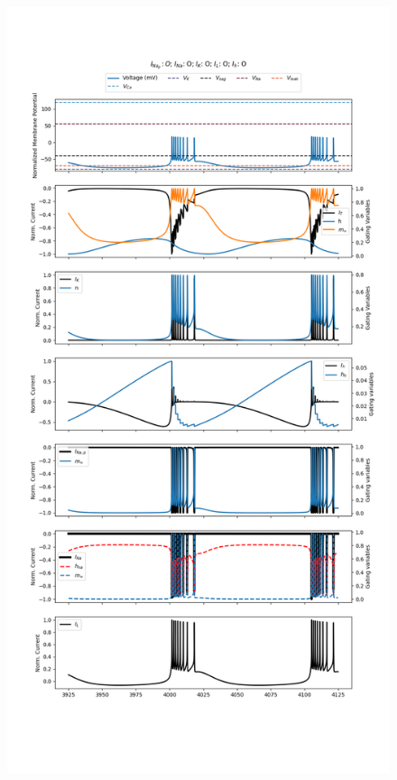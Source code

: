 \documentclass[../../workflow.tex]{subfiles}
\begin{document}
\begin{figure}[H]
    \centering
    \includegraphics[height=\textheight]{img/r5/wang1994/experiment_0.png}
\end{figure}
\end{document}
